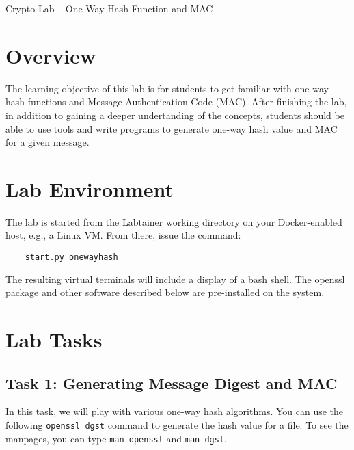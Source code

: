 







\begin{center}
{\LARGE Crypto Lab -- One-Way Hash Function and MAC}
\end{center}

\copyrightnotice

\setcounter{task}{1}
\newcommand{\tasks} {\bf {\noindent (\arabic{task})} \addtocounter{task}{1} \,}

\section{Overview}

The learning objective of this lab is for students to get familiar with
one-way hash functions and Message Authentication Code (MAC). After 
finishing the lab, in addition to gaining a deeper undertanding
of the concepts, students should be able to 
use tools and 
write programs to generate one-way hash value and MAC for 
a given message.


\section{Lab Environment}
The lab is started from the Labtainer working
directory on your Docker-enabled host, e.g., a Linux VM.
From there, issue the command:
\begin{verbatim}
    start.py onewayhash
\end{verbatim}
The resulting virtual terminals will include a display of
a bash shell.  The openssl package
and other software described below are pre-installed
on the system.


\section{Lab Tasks}

\subsection{Task 1: Generating Message Digest and MAC}

In this task, we will play with various one-way hash algorithms. 
You can use the following {\tt openssl dgst} 
command to generate the hash value for a file. To see the manpages, you can 
type {\tt man openssl} and {\tt man dgst}.

